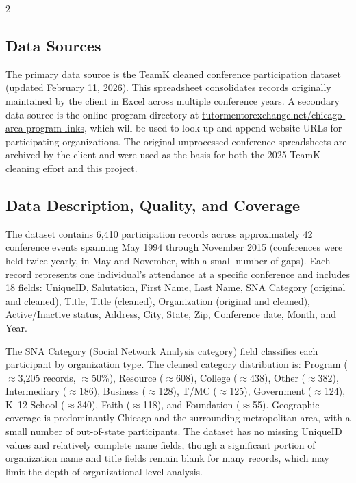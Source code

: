 \documentclass[11pt,letterpaper]{article}
\begin{document}
\begin{multicols}{2}
\subsection{Data Sources}

The primary data source is the TeamK cleaned conference participation dataset
(updated February 11, 2026). This spreadsheet consolidates records originally
maintained by the client in Excel across multiple conference years. A secondary
data source is the online program directory at
\href{https://tutormentorexchange.net/chicago-area-program-links}{tutormentorexchange.net/chicago-area-program-links},
which will be used to look up and append website URLs for participating
organizations. The original unprocessed conference spreadsheets are archived by
the client and were used as the basis for both the 2025 TeamK cleaning effort
and this project.

\subsection{Data Description, Quality, and Coverage}

The dataset contains 6,410 participation records across approximately 42
conference events spanning May 1994 through November 2015 (conferences were
held twice yearly, in May and November, with a small number of gaps). Each
record represents one individual's attendance at a specific conference and
includes 18 fields: UniqueID, Salutation, First Name, Last Name, SNA Category
(original and cleaned), Title, Title (cleaned), Organization (original and
cleaned), Active/Inactive status, Address, City, State, Zip, Conference date,
Month, and Year.

The SNA Category (Social Network Analysis category) field classifies each
participant by organization type. The cleaned category distribution is: Program
(${\approx}$3,205 records, ${\approx}$50\%), Resource (${\approx}$608), College
(${\approx}$438), Other (${\approx}$382), Intermediary (${\approx}$186),
Business (${\approx}$128), T/MC (${\approx}$125), Government (${\approx}$124),
K--12 School (${\approx}$340), Faith (${\approx}$118), and Foundation
(${\approx}$55). Geographic coverage is predominantly Chicago and the surrounding
metropolitan area, with a small number of out-of-state participants. The dataset
has no missing UniqueID values and relatively complete name fields, though a
significant portion of organization name and title fields remain blank for many
records, which may limit the depth of organizational-level analysis.


\end{multicols}
\end{document}
